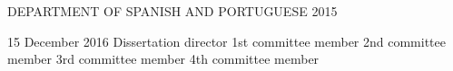 

\maketitlepage
{DEPARTMENT OF SPANISH AND PORTUGUESE}	%
{2015}									%


\approval
{15 December 2016}			%
{Dissertation director}		%
{1st committee member}		%
{2nd committee member}		%
{3rd committee member}		%
{4th committee member}		%



\statementbyauthor[]






\tableofcontents


\listoffigures


\listoftables


